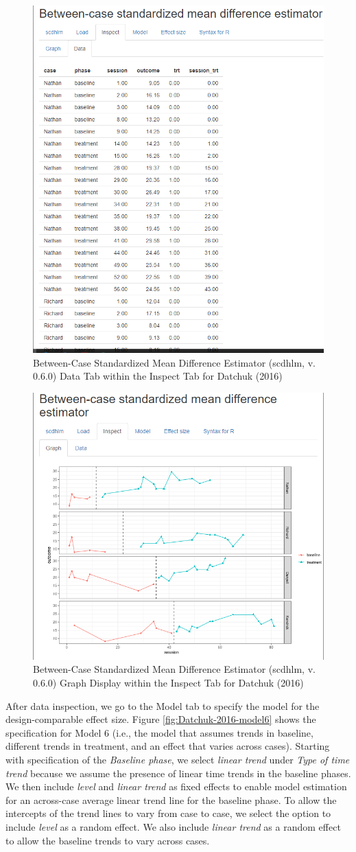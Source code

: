 \documentclass[
]{book}
\begin{document}
\begin{figure}
\includegraphics[width=0.6\linewidth]{images/app.inspect.data_Datchuk2016} \caption{Between-Case Standardized Mean Difference Estimator (scdhlm, v. 0.6.0) Data Tab within the Inspect Tab for Datchuk (2016)}\label{fig:Datchuk-2016-inspect-data}
\end{figure}

\begin{figure}
\includegraphics[width=0.6\linewidth]{images/app.inspect.graph_Datchuk2016} \caption{Between-Case Standardized Mean Difference Estimator (scdhlm, v. 0.6.0) Graph Display within the Inspect Tab for Datchuk (2016)}\label{fig:Datchuk-2016-inspect-graph}
\end{figure}

After data inspection, we go to the Model tab to specify the model for the design-comparable effect size. Figure \ref{fig:Datchuk-2016-model6} shows the specification for Model 6 (i.e., the model that assumes trends in baseline, different trends in treatment, and an effect that varies across cases). Starting with specification of the \emph{Baseline phase}, we select \emph{linear trend} under \emph{Type of time trend} because we assume the presence of linear time trends in the baseline phases. We then include \emph{level} and \emph{linear trend} as fixed effects to enable model estimation for an across-case average linear trend line for the baseline phase. To allow the intercepts of the trend lines to vary from case to case, we select the option to include \emph{level} as a random effect. We also include \emph{linear trend} as a random effect to allow the baseline trends to vary across cases.
\end{document}
